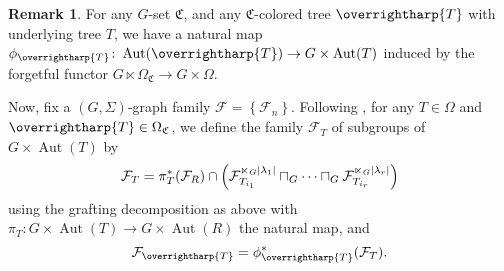 \documentclass[a4paper,10pt
,draft
]{article}%
\numberwithin{equation}{section}
\numberwithin{figure}{section}
\theoremstyle{definition} %
\newtheorem{remark}[equation]{Remark}%
\newcommand{\set}[1]{\left\{#1\right\}}%
\newcommand{\vect}[1]{\text{\overrightharp{\ensuremath{#1}}}}
\DeclareMathOperator{\Aut}{Aut}%
\newcommand{\F}{\ensuremath{\mathcal F}}
\newcommand{\1}{\ensuremath{\mathbbm 1}}%
\begin{document}
\begin{remark}
      For any $G$-set $\mathfrak C$, and any $\mathfrak C$-colored tree $\vect T$ with underlying tree $T$,
      we have a natural map $\phi_{\vect T} \colon \Aut(\vect T) \to G \times \Aut(T)$ induced by the forgetful functor $G \ltimes \Omega_{\mathfrak C} \to G \times \Omega$.

      Now, fix a $(G,\Sigma)$-graph family $\mathcal F = \set{\F_n}$.
      Following \cite[Prop. 6.44, Lemma 6.49]{BP_geo}, for any $T \in \Omega$ and $\vect T \in \Omega_{\mathfrak C}$,
      we define the family $\F_T$ of subgroups of $G \times \Aut(T)$ by
      \begin{equation}
            \label{FT_EQ}
            \F_T = \pi_T^{\**}(\F_R) \cap \left( \F_{T_{i_1}}^{\ltimes_G |\lambda_1|} \sqcap_G \dots \sqcap_G \F_{T_{i_r}}^{\ltimes_G |\lambda_r|} \right)
      \end{equation}
      using the grafting decomposition as above
      with $\pi_{T} \colon G \times \Aut(T) \to G \times \Aut(R)$ the natural map,
      and
      \begin{equation}
            \label{FVT_EQ}
            \F_{\vect T} = \phi_{\vect T}^{\**}(\F_T).
      \end{equation}
\end{remark}
\end{document}
